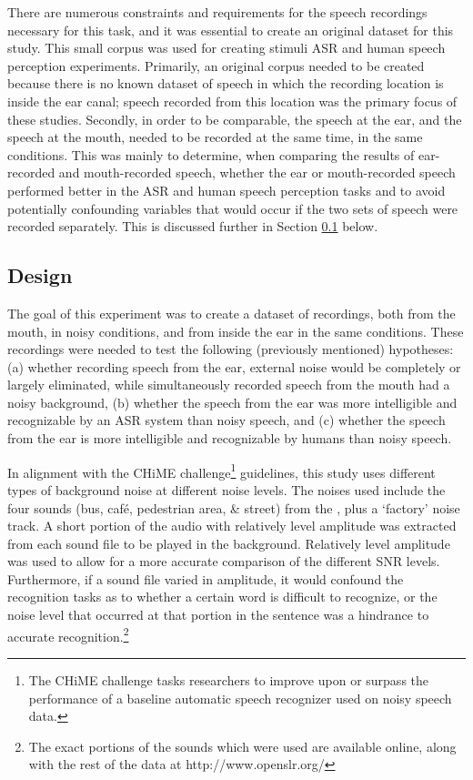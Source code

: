 There are numerous constraints and requirements for the speech recordings necessary for this task, and it was essential to create an original dataset for this study.  This small corpus was used for creating stimuli ASR and human speech perception experiments.  Primarily, an original corpus needed to be created because there is no known dataset of speech in which the recording location is inside the ear canal; speech recorded from this location was the primary focus of these studies.  Secondly, in order to be comparable, the speech at the ear, and the speech at the mouth, needed to be recorded at the same time, in the same conditions.  This was mainly to determine, when comparing the results of ear-recorded and mouth-recorded speech, whether the ear or mouth-recorded speech performed better in the ASR and human speech perception tasks and to avoid potentially confounding variables that would occur if the two sets of speech were recorded separately. This is discussed further in Section \ref{chap2:methods:design} below.

\subsection{Design}
\label{chap2:methods:design}
   
The goal of this experiment was to create a dataset of recordings, both from the mouth, in noisy conditions, and from inside the ear in the same conditions.  These recordings were needed to test the following (previously mentioned) hypotheses: (a) whether recording speech from the ear, external noise would be completely or largely eliminated, while simultaneously recorded speech from the mouth had a noisy background, (b) whether the speech from the ear was more intelligible and recognizable by an ASR system than noisy speech, and (c) whether the speech from the ear is more intelligible and recognizable by humans than noisy speech. 

In alignment with the CHiME challenge\footnote{The CHiME challenge tasks researchers to improve upon or surpass the performance of a baseline automatic speech recognizer used on noisy speech data.} guidelines, this study uses different types of background noise at different noise levels.  The noises used include the four sounds (bus, caf\'{e}, pedestrian area, \& street) from the \cite{chime:16}, plus a `factory' noise track.  A short portion of the audio with relatively level amplitude was extracted from each sound file to be played in the background.  Relatively level amplitude was used to allow for a more accurate comparison of the different SNR levels. Furthermore, if a sound file varied in amplitude, it would confound the recognition tasks as to whether a certain word is difficult to recognize, or the noise level that occurred at that portion in the sentence was a hindrance to accurate recognition.\footnote{The exact portions of the sounds which were used are available online, along with the rest of the data at http://www.openslr.org/}

